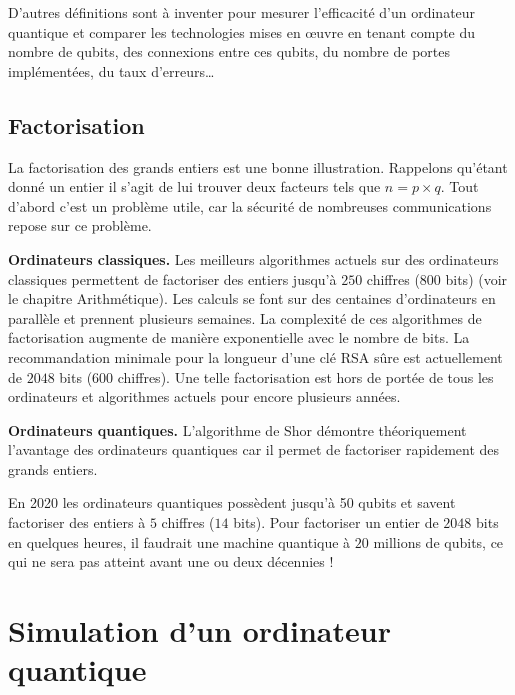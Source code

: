 \documentclass[11pt,class=report,crop=false]{standalone}
\begin{document}
\medskip

D'autres définitions sont à inventer pour mesurer l'efficacité d'un ordinateur quantique et comparer les technologies mises en \oe uvre en tenant compte du nombre de qubits, des connexions entre ces qubits, du nombre de portes implémentées, du taux d'erreurs\ldots


\subsection{Factorisation}


La factorisation des grands entiers est une bonne illustration.
Rappelons qu'étant donné un entier il s'agit de lui trouver deux facteurs tels que $n=p\times q$. Tout d'abord c'est un problème utile, car la sécurité de nombreuses communications repose sur ce problème.

\medskip

\textbf{Ordinateurs classiques.} 
Les meilleurs algorithmes actuels sur des ordinateurs classiques permettent de factoriser des entiers jusqu'à $250$ chiffres ($800$ bits) (voir le chapitre \og{}Arithmétique\fg{}). Les calculs se font sur des centaines d'ordinateurs en parallèle et prennent plusieurs semaines.
La complexité  de ces algorithmes de factorisation augmente de manière exponentielle avec le nombre de bits. 
La recommandation  minimale pour la longueur d'une clé RSA sûre est actuellement de $2048$ bits ($600$ chiffres). Une telle factorisation est hors de portée de tous les ordinateurs et algorithmes actuels pour encore plusieurs années.

\medskip

\textbf{Ordinateurs quantiques.} 
L'algorithme de Shor démontre théoriquement l'avantage des ordinateurs quantiques car il permet de factoriser rapidement des grands entiers.

En 2020 les ordinateurs quantiques possèdent jusqu'à 50 qubits et savent factoriser des entiers à $5$ chiffres ($14$ bits). Pour factoriser un entier de $2048$ bits en quelques heures, il faudrait une machine quantique à $20$ millions de qubits, ce qui ne sera pas atteint avant une ou deux décennies !



\section{Simulation d'un ordinateur quantique}
\end{document}
